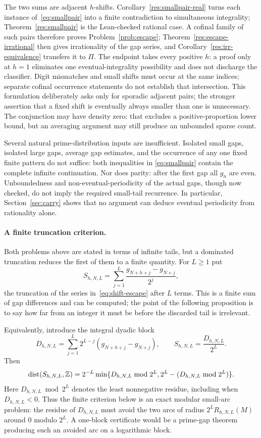 \documentclass[11pt]{article}
\begin{document}
The two sums are adjacent $h$-shifts.  Corollary~\ref{res:smallpair-real} turns
each instance of~\eqref{eq:smallpair} into a finite contradiction to
simultaneous integrality; Theorem~\ref{res:smallpair} is the Lean-checked
rational case.  A cofinal family of such pairs therefore proves
Problem~\ref{prob:escape}; Theorem~\ref{res:escape-irrational} then gives irrationality
of the gap series, and Corollary~\ref{res:irr-equivalence} transfers it to
$\Pi$.  The endpoint takes every positive $h$: a proof only at $h=1$
eliminates one eventual-integrality possibility and does not discharge the
classifier.  Digit mismatches and small shifts must occur at the same indices;
separate cofinal occurrence statements do not establish that intersection.
This formulation deliberately asks only for sporadic adjacent pairs;
the stronger assertion that a fixed shift is eventually always smaller than
one is unnecessary.  The conjunction may have density zero: that excludes a
positive-proportion lower bound, but an averaging argument may still produce
an unbounded sparse count.

Several natural prime-distribution inputs are insufficient.  Isolated
small gaps, isolated large gaps, average gap estimates, and the occurrence of
any one fixed finite pattern do not suffice: both inequalities in
\eqref{eq:smallpair} contain the complete infinite continuation.  Nor
does parity: after the first gap all $g_n$ are even.  Unboundedness and
non-eventual-periodicity of the actual gaps, though now checked, do not imply
the required small-tail recurrence.  In particular, Section~\ref{sec:carry}
shows that no argument can deduce eventual periodicity from rationality alone.

\paragraph{A finite truncation criterion.}
Both problems above are stated in terms of infinite tails, but a dominated
truncation reduces the first of them to a finite quantity.  For $L\ge1$ put
\[
 S_{h,N,L}=\sum_{j=1}^{L}
 \frac{g_{N+h+j}-g_{N+j}}{2^j},
\]
the truncation of the series in~\eqref{eq:shift-escape} after $L$ terms.  This
is a finite sum of gap differences and can be computed; the point of the
following proposition is to say how far from an integer it must be before the
discarded tail is irrelevant.

Equivalently, introduce the integral dyadic block
\[
 D_{h,N,L}=\sum_{j=1}^{L}2^{L-j}
   (g_{N+h+j}-g_{N+j}),\qquad S_{h,N,L}=\frac{D_{h,N,L}}{2^L}.
\]
Then
\[
 \operatorname{dist}(S_{h,N,L},\mathbb{Z})
 =2^{-L}\min\{D_{h,N,L}\bmod2^L,
 2^L-(D_{h,N,L}\bmod2^L)\}.
\]
Here $D_{h,N,L}\bmod2^L$ denotes the least nonnegative residue, including
when $D_{h,N,L}<0$.
Thus the finite criterion below is an exact modular small-arc problem: the
residue of $D_{h,N,L}$ must avoid the two arcs of radius
$2^LR_{h,N,L}(M)$ around $0$ modulo $2^L$.  A one-block certificate would be a
prime-gap theorem producing such an avoided arc on a logarithmic block.
\end{document}
